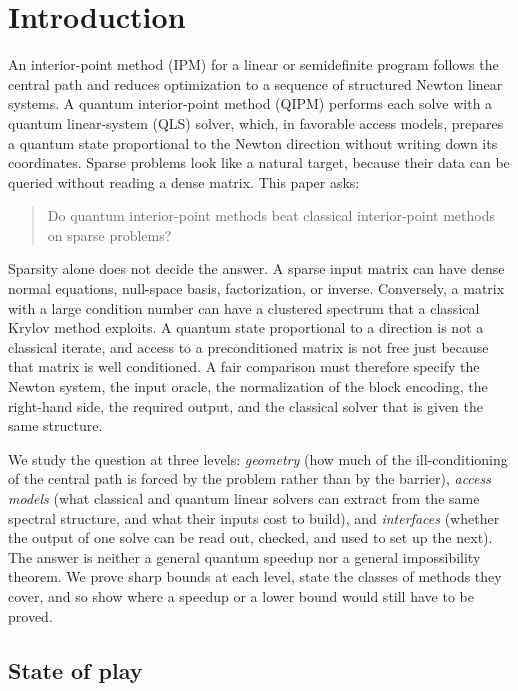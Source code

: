 \section{Introduction}
\label{sec:introduction}

An interior-point method (IPM) for a linear or semidefinite program follows
the central path and reduces optimization to a sequence of structured Newton
linear systems.  A quantum interior-point method (QIPM) performs each solve
with a quantum linear-system (QLS) solver, which, in favorable access models,
prepares a quantum state proportional to the Newton direction without writing
down its coordinates.  Sparse problems look like a natural target, because
their data can be queried without reading a dense matrix.  This paper asks:
\begin{quote}
Do quantum interior-point methods beat classical interior-point methods on
sparse problems?
\end{quote}
Sparsity alone does not decide the answer.  A sparse input matrix can have
dense normal equations, null-space basis, factorization, or inverse.
Conversely, a matrix with a large condition number can have a
clustered spectrum that a classical Krylov method exploits.  A quantum state
proportional to a direction is not a classical iterate, and access to a
preconditioned matrix is not free just because that matrix is well
conditioned.  A fair comparison must therefore specify the Newton system, the
input oracle, the normalization of the block encoding, the right-hand side,
the required output, and the classical solver that is given the same
structure.

We study the question at three levels: \emph{geometry} (how much of the
ill-conditioning of the central path is forced by the problem rather than by
the barrier), \emph{access models} (what classical and quantum linear solvers
can extract from the same spectral structure, and what their inputs cost to
build), and \emph{interfaces} (whether the output of one solve can be read
out, checked, and used to set up the next).  The answer is neither a general
quantum speedup nor a general impossibility theorem.  We prove sharp bounds
at each level, state the classes of methods they cover, and so show where a
speedup or a lower bound would still have to be proved.

\subsection{State of play}
\label{sec:introduction-state-of-play}

